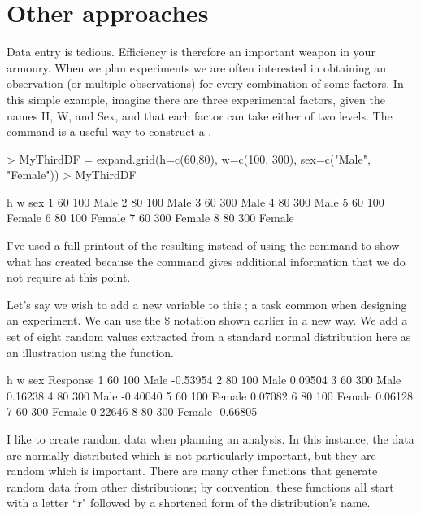 \section{Other approaches} 
 
Data entry is tedious. Efficiency is therefore an important weapon in your armoury. When we plan experiments we are often interested in obtaining an observation (or multiple observations) for every combination of some factors. In this simple example, imagine there are three experimental factors, given the names H, W, and Sex, and that each factor can take either of two levels. The  command is a useful way to construct a . 
\begin{Schunk}
\begin{Sinput}
> MyThirdDF = expand.grid(h=c(60,80), w=c(100, 300), sex=c("Male", "Female")) 
> MyThirdDF 
\end{Sinput}
\begin{Soutput}
   h   w    sex
1 60 100   Male
2 80 100   Male
3 60 300   Male
4 80 300   Male
5 60 100 Female
6 80 100 Female
7 60 300 Female
8 80 300 Female
\end{Soutput}
\end{Schunk}
 
I've used a full printout of the resulting  instead of using the  command to show what \R{} has created because the  command gives additional information that we do not require at this point. 
 
Let's say we wish to add a new variable to this ; a task common when designing an experiment. We can use the \$ notation shown earlier in a new way. We add a set of eight random values extracted from a standard normal distribution here as an illustration using the  function. 
\begin{Schunk}
\begin{Soutput}
   h   w    sex Response
1 60 100   Male -0.53954
2 80 100   Male  0.09504
3 60 300   Male  0.16238
4 80 300   Male -0.40040
5 60 100 Female  0.07082
6 80 100 Female  0.06128
7 60 300 Female  0.22646
8 80 300 Female -0.66805
\end{Soutput}
\end{Schunk}
 
I like to create random data when planning an analysis. In this instance, the data are normally distributed which is not particularly important, but they are random which is important. There are many other functions that generate random data from other distributions; by convention, these functions all start with a letter ``r" followed by a shortened form of the distribution's name.  
 
